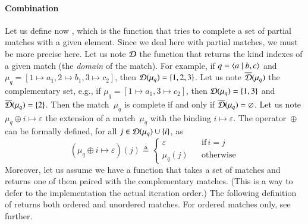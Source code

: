 \paragraph{Combination}

Let us define now , which is the function that tries to
complete a set of partial matches with a given element. Since we deal
here with partial matches, we must be more precise here. Let us note
\(\cal D\) the function that returns the kind indexes of a given match
(the \emph{domain} of the match). For example, if \(q =
\langle a \mid b,c\rangle\) and \(\mu_q = [1 \mapsto a_1, 2 \mapsto b_1, 3
  \mapsto c_2]\), then \({\cal D}(\mu_q) = \{1,2,3\}\). Let us note
\(\overline{\cal D}(\mu_q)\) the complementary set, e.g., if \(\mu_q = [1 \mapsto a_1, 3 \mapsto c_2]\), then \({\cal D}(\mu_q) = \{1,3\}\) and \(\overline{\cal D}(\mu_q) = \{2\}\). Then the match~\(\mu_q\) is
complete if and only if \(\overline{\cal D}(\mu_q) =
\varnothing\). Let us note \(\mu_q \oplus i \mapsto \varepsilon\) the
extension of a match~\(\mu_q\) with the binding \(i \mapsto
\varepsilon\). The operator~\(\oplus\) can be formally defined, for
all \(j \in {\cal D}(\mu_q) \cup \{i\}\), as
\begin{equation*}
(\mu_q \oplus i \mapsto \varepsilon)(j) \triangleq
\left\{
\begin{aligned}
\varepsilon && \text{if} \, i = j\\
\mu_q(j)    && \text{otherwise}
\end{aligned}
\right.
\end{equation*}
Moreover, let us assume we have a function  that takes a
set of matches and returns one of them paired with the complementary
matches. (This is a way to defer to the implementation the actual
iteration order.) The following definition of  returns
both ordered and unordered matches. For ordered matches only, see
further.
